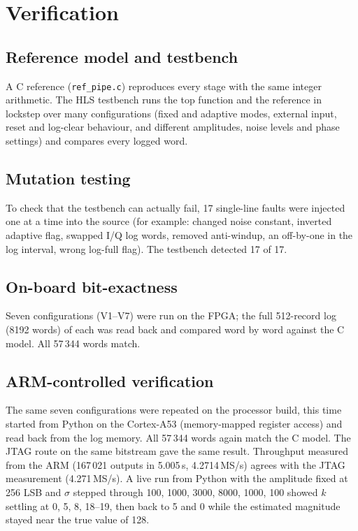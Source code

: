 \documentclass[journal]{IEEEtran}
\begin{document}
\section{Verification}
\subsection{Reference model and testbench}
A C reference (\texttt{ref\_pipe.c}) reproduces every stage with the same integer arithmetic. The HLS testbench runs the top function and the reference in lockstep over many configurations (fixed and adaptive modes, external input, reset and log-clear behaviour, and different amplitudes, noise levels and phase settings) and compares every logged word.
\subsection{Mutation testing}
To check that the testbench can actually fail, 17 single-line faults were injected one at a time into the source (for example: changed noise constant, inverted adaptive flag, swapped I/Q log words, removed anti-windup, an off-by-one in the log interval, wrong log-full flag). The testbench detected 17 of 17.
\subsection{On-board bit-exactness}
Seven configurations (V1--V7) were run on the FPGA; the full 512-record log (8192 words) of each was read back and compared word by word against the C model. All 57\,344 words match.
\subsection{ARM-controlled verification}
The same seven configurations were repeated on the processor build, this time started from Python on the Cortex-A53 (memory-mapped register access) and read back from the log memory. All 57\,344 words again match the C model. The JTAG route on the same bitstream gave the same result. Throughput measured from the ARM (167\,021 outputs in 5.005\,s, 4.2714\,MS/s) agrees with the JTAG measurement (4.271\,MS/s). A live run from Python with the amplitude fixed at 256 LSB and $\sigma$ stepped through 100, 1000, 3000, 8000, 1000, 100 showed $k$ settling at 0, 5, 8, 18--19, then back to 5 and 0 while the estimated magnitude stayed near the true value of 128.
\end{document}

